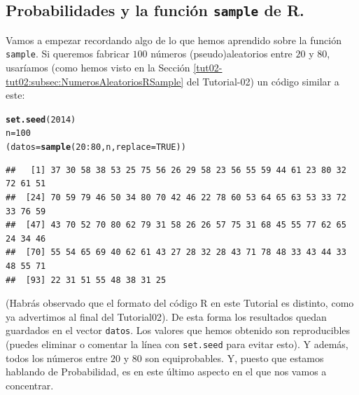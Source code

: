 \documentclass[10pt,a4paper]{article}\usepackage[]{graphicx}\usepackage[]{color}
\makeatletter
\newcommand{\hlnum}[1]{\textcolor[rgb]{0.686,0.059,0.569}{#1}}%
\newcommand{\hlopt}[1]{\textcolor[rgb]{0,0,0}{#1}}%
\newcommand{\hlstd}[1]{\textcolor[rgb]{0.345,0.345,0.345}{#1}}%
\newcommand{\hlkwb}[1]{\textcolor[rgb]{0.69,0.353,0.396}{#1}}%
\newcommand{\hlkwc}[1]{\textcolor[rgb]{0.333,0.667,0.333}{#1}}%
\newcommand{\hlkwd}[1]{\textcolor[rgb]{0.737,0.353,0.396}{\textbf{#1}}}%
\newenvironment{kframe}{%
 \def\at@end@of@kframe{}%
 \ifinner\ifhmode%
  \def\at@end@of@kframe{\end{minipage}}%
  \begin{minipage}{\columnwidth}%
 \fi\fi%
 \def\FrameCommand##1{\hskip\@totalleftmargin \hskip-\fboxsep
 \colorbox{shadecolor}{##1}\hskip-\fboxsep
     \hskip-\linewidth \hskip-\@totalleftmargin \hskip\columnwidth}%
 \MakeFramed {\advance\hsize-\width
   \@totalleftmargin\z@ \linewidth\hsize
   \@setminipage}}%
 {\par\unskip\endMakeFramed%
 \at@end@of@kframe}
\newenvironment{knitrout}{}{} %
\makeatother
\begin{document}
\subsection{Probabilidades y la función {\tt sample} de R.}

Vamos a empezar recordando algo de lo que hemos aprendido sobre la función {\tt sample}. Si queremos fabricar $100$ números (pseudo)aleatorios entre $20$ y $80$, usaríamos (como hemos visto en la Sección \ref{tut02-tut02:subsec:NumerosAleatoriosRSample} del Tutorial-02) un código similar a este:
\begin{knitrout}
\color{fgcolor}\begin{kframe}
\begin{alltt}
\hlkwd{set.seed}\hlstd{(}\hlnum{2014}\hlstd{)}
\hlstd{n}\hlkwb{=}\hlnum{100}
\hlstd{(datos} \hlkwb{=} \hlkwd{sample}\hlstd{(}\hlnum{20}\hlopt{:}\hlnum{80}\hlstd{, n,} \hlkwc{replace}\hlstd{=}\hlnum{TRUE}\hlstd{))}
\end{alltt}
\begin{verbatim}
##   [1] 37 30 58 38 53 25 75 56 26 29 58 23 56 55 59 44 61 23 80 32 72 61 51
##  [24] 70 59 79 46 50 34 80 70 42 46 22 78 60 53 64 65 63 53 33 72 33 76 59
##  [47] 43 70 52 70 80 62 79 31 58 26 26 57 75 31 68 45 55 77 62 65 24 34 46
##  [70] 55 54 65 69 40 62 61 43 27 28 32 28 43 71 78 48 33 43 44 33 48 55 71
##  [93] 22 31 51 55 48 38 31 25
\end{verbatim}
\end{kframe}
\end{knitrout}
(Habrás observado que el formato del código R en este Tutorial es distinto, como ya advertimos al final  del Tutorial02). De esta forma los resultados quedan guardados en el vector {\tt datos}. Los valores que hemos obtenido son reproducibles (puedes eliminar o comentar la línea con {\tt set.seed} para evitar esto). Y además, todos los números entre $20$ y $80$ son equiprobables. Y, puesto que estamos hablando de Probabilidad, es en este último aspecto en el que nos vamos a concentrar.
\end{document}
